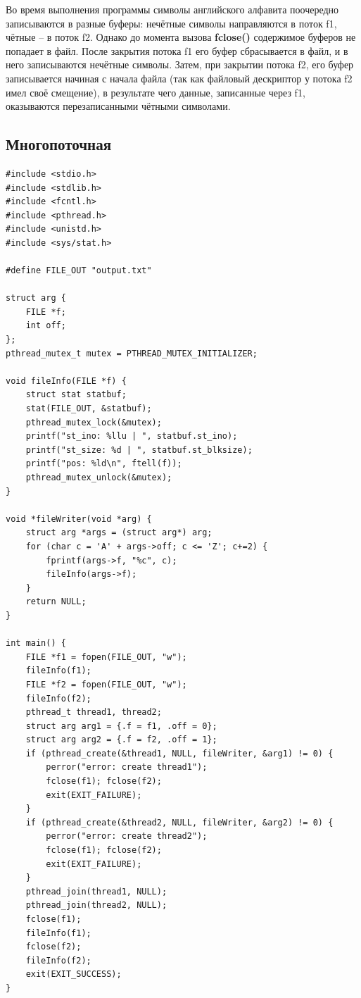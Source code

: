 Во время выполнения программы символы английского алфавита поочередно записываются в разные буферы: нечётные символы направляются в поток f1, чётные -- в поток f2. Однако до момента вызова \textbf{fclose()} содержимое буферов не попадает в файл. После закрытия потока f1 его буфер сбрасывается в файл, и в него записываются нечётные символы. Затем, при закрытии потока f2, его буфер записывается начиная с начала файла (так как файловый дескриптор у потока f2 имел своё смещение), в результате чего данные, записанные через f1, оказываются перезаписанными чётными символами.

\subsection*{Многопоточная}
\begin{lstlisting}[caption=Многопоточная программа c двумя дополнительными потоками,label=lst:FILEstruct11111]
#include <stdio.h>
#include <stdlib.h>
#include <fcntl.h>
#include <pthread.h>
#include <unistd.h>
#include <sys/stat.h>

#define FILE_OUT "output.txt"

struct arg {
	FILE *f;
	int off;
};
pthread_mutex_t mutex = PTHREAD_MUTEX_INITIALIZER;

void fileInfo(FILE *f) {
	struct stat statbuf;
	stat(FILE_OUT, &statbuf);
	pthread_mutex_lock(&mutex);
	printf("st_ino: %llu | ", statbuf.st_ino);
	printf("st_size: %d | ", statbuf.st_blksize);
	printf("pos: %ld\n", ftell(f));
	pthread_mutex_unlock(&mutex);
}

void *fileWriter(void *arg) {
	struct arg *args = (struct arg*) arg;
	for (char c = 'A' + args->off; c <= 'Z'; c+=2) {
		fprintf(args->f, "%c", c);
		fileInfo(args->f);
	}
	return NULL;
}

int main() {
	FILE *f1 = fopen(FILE_OUT, "w");
	fileInfo(f1);
	FILE *f2 = fopen(FILE_OUT, "w");
	fileInfo(f2);
	pthread_t thread1, thread2;
	struct arg arg1 = {.f = f1, .off = 0}; 
	struct arg arg2 = {.f = f2, .off = 1};
	if (pthread_create(&thread1, NULL, fileWriter, &arg1) != 0) {
		perror("error: create thread1");
		fclose(f1); fclose(f2);
		exit(EXIT_FAILURE);
	}
	if (pthread_create(&thread2, NULL, fileWriter, &arg2) != 0) {
		perror("error: create thread2");
		fclose(f1); fclose(f2);
		exit(EXIT_FAILURE);
	}
	pthread_join(thread1, NULL);
	pthread_join(thread2, NULL);
	fclose(f1);
	fileInfo(f1);
	fclose(f2);
	fileInfo(f2);
	exit(EXIT_SUCCESS);
}
\end{lstlisting}

